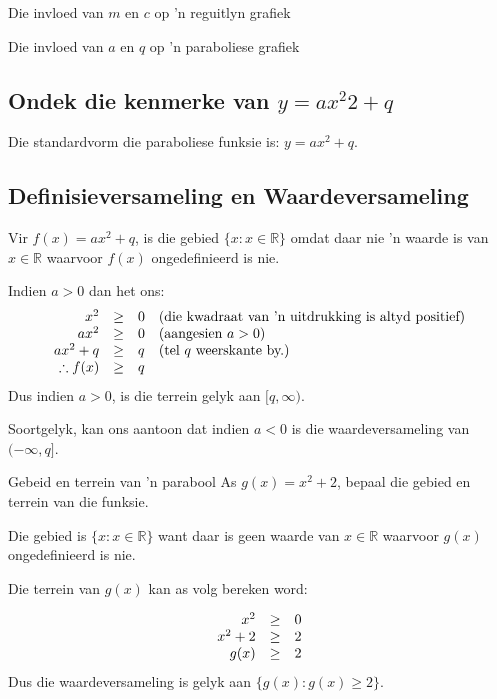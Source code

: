 \begin{Ondersoek}{Die invloed van $m$ en $c$ op 'n reguitlyn grafiek}
\begin{Ondersoek}{Die invloed van $a$ en $q$ op 'n paraboliese grafiek}
\subsection*{Ondek die kenmerke van $y=ax^2{2} + q$}
Die standardvorm die paraboliese funksie is:  $y=ax^{2} + q$.
\subsection*{Definisieversameling en Waardeversameling}

Vir $f(x)=a{x}^{2}+q$, is die gebied $\{x:x\in \mathbb{R}\}$ omdat daar nie ’n waarde is van $x\in \mathbb{R}$ waarvoor $f(x)$ ongedefinieerd is nie.\par 
\par 
Indien $a>0$ dan het ons:
\begin{equation*}
\begin{array}{cccl}\hfill {x}^{2}& \geq & 0\hfill & (\mbox{die kwadraat van ’n uitdrukking is altyd positief})\hfill \\
 \hfill a{x}^{2}& \geq & 0\hfill & (\mbox{aangesien } a>0)\hfill \\
 \hfill a{x}^{2}+q& \geq & q\hfill & (\mbox{tel $q$ weerskante by.}) \\
 \hfill \therefore f(x)& \geq & q\hfill & 
\end{array}
\end{equation*}
Dus indien $a>0$, is die terrein gelyk aan $[q,\infty )$.\par 
Soortgelyk, kan ons aantoon dat indien  $a<0$ is die waardeversameling van $ (-\infty ,q]$. 

\begin{wex}{Gebeid en terrein van 'n parabool}
{As $g(x)={x}^{2}+2$, bepaal die gebied en terrein van die funksie.}
{
Die gebied is $\{x:x\in \mathbb{R}\}$ want daar is geen waarde van $x\in \mathbb{R}$ waarvoor $g(x)$ ongedefinieerd is nie.

Die terrein van $g(x)$ kan as volg bereken word:

\begin{equation*}
\begin{array}{ccc}\hfill {x}^{2}& \geq & 0\hfill \\
 \hfill {x}^{2}+2& \geq & 2\hfill \\
 \hfill g(x)& \geq & 2\hfill 
\end{array}
\end{equation*}
Dus die waardeversameling is gelyk aan $\{g(x):g(x)\geq 2\}$.
}
\end{wex}




\end{Ondersoek}
\end{Ondersoek}
